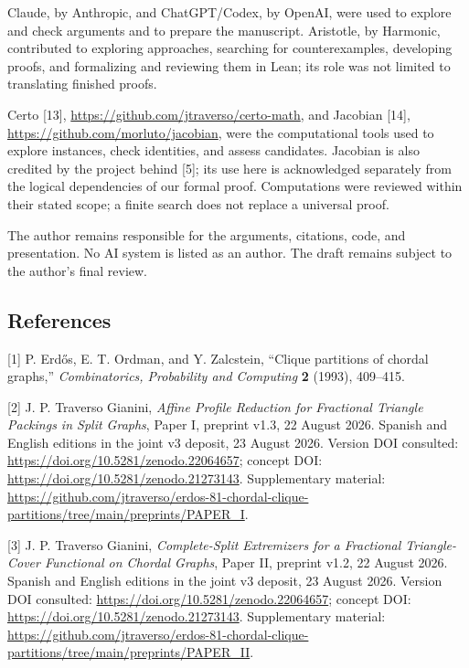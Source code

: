 \documentclass[english,11pt,a4paper]{article}
\begin{document}
Claude, by Anthropic, and ChatGPT/Codex, by OpenAI, were used to explore and check arguments and to prepare the manuscript. Aristotle, by Harmonic, contributed to exploring approaches, searching for counterexamples, developing proofs, and formalizing and reviewing them in Lean; its role was not limited to translating finished proofs.

Certo {[}13{]}, \url{https://github.com/jtraverso/certo-math}, and Jacobian {[}14{]}, \url{https://github.com/morluto/jacobian}, were the computational tools used to explore instances, check identities, and assess candidates. Jacobian is also credited by the project behind {[}5{]}; its use here is acknowledged separately from the logical dependencies of our formal proof. Computations were reviewed within their stated scope; a finite search does not replace a universal proof.

The author remains responsible for the arguments, citations, code, and presentation. No AI system is listed as an author. The draft remains subject to the author's final review.

\clearpage
\subsection{References}
\begingroup\small\setlength{\parskip}{4pt}\label{references}

{[}1{]} P. Erdős, E. T. Ordman, and Y. Zalcstein, ``Clique partitions of chordal graphs,'' \emph{Combinatorics, Probability and Computing} \textbf{2} (1993), 409--415.

{[}2{]} J. P. Traverso Gianini, \emph{Affine Profile Reduction for Fractional Triangle Packings in Split Graphs}, Paper I, preprint v1.3, 22 August 2026. Spanish and English editions in the joint v3 deposit, 23 August 2026. Version DOI consulted: \url{https://doi.org/10.5281/zenodo.22064657}; concept DOI: \url{https://doi.org/10.5281/zenodo.21273143}. Supplementary material: \url{https://github.com/jtraverso/erdos-81-chordal-clique-partitions/tree/main/preprints/PAPER_I}.

{[}3{]} J. P. Traverso Gianini, \emph{Complete-Split Extremizers for a Fractional Triangle-Cover Functional on Chordal Graphs}, Paper II, preprint v1.2, 22 August 2026. Spanish and English editions in the joint v3 deposit, 23 August 2026. Version DOI consulted: \url{https://doi.org/10.5281/zenodo.22064657}; concept DOI: \url{https://doi.org/10.5281/zenodo.21273143}. Supplementary material: \url{https://github.com/jtraverso/erdos-81-chordal-clique-partitions/tree/main/preprints/PAPER_II}.
\end{document}
